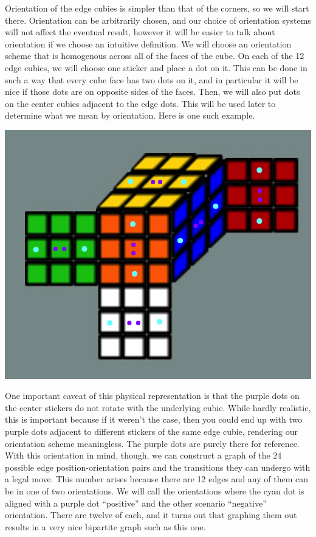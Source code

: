\documentclass[10pt,letterpaper]{report}
\begin{document}
Orientation of the edge cubies is simpler than that of the corners, so we will start there.  Orientation can be arbitrarily chosen, and our choice of orientation systems will not affect the eventual result, however it will be easier to talk about orientation if we choose an intuitive definition.  We will choose an orientation scheme that is homogenous across all of the faces of the cube.  On each of the 12 edge cubies, we will choose one sticker and place a dot on it.  This can be done in such a way that every cube face has two dots on it, and in particular it will be nice if those dots are on opposite sides of the faces.  Then, we will also put dots on the center cubies adjacent to the edge dots.  This will be used later to determine what we mean by orientation.  Here is one such example.

\begin{center}
\includegraphics[scale=.65]{images/edgeOrientation.png} 
\end{center}

One important caveat of this physical representation is that the purple dots on the center stickers do not rotate with the underlying cubie.  While hardly realistic, this is important because if it weren't the case, then you could end up with two purple dots adjacent to different stickers of the same edge cubie, rendering our orientation scheme meaningless.  The purple dots are purely there for reference.  With this orientation in mind, though, we can construct a graph of the 24 possible edge position-orientation pairs and the transitions they can undergo with a legal move.  This number arises because there are 12 edges and any of them can be in one of two orientations.  We will call the orientations where the cyan dot is aligned with a purple dot ``positive'' and the other scenario ``negative'' orientation.  There are twelve of each, and it turns out that graphing them out results in a very nice bipartite graph such as this one.
\end{document}
